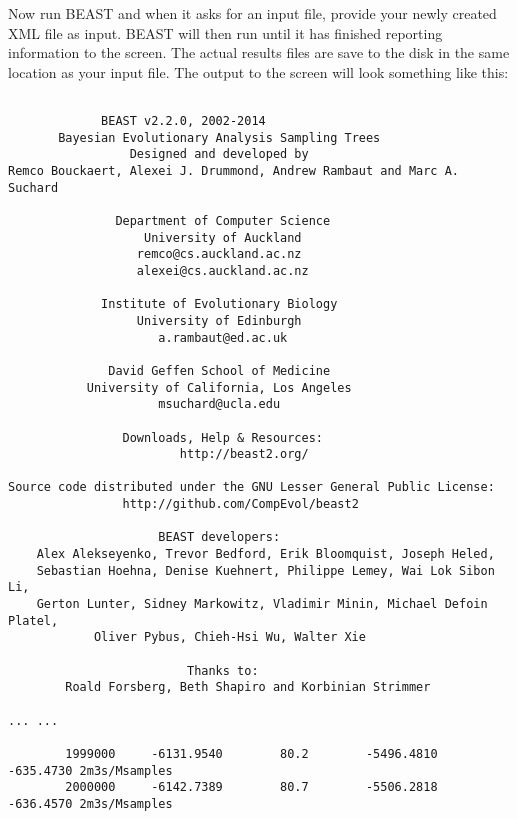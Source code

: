 \documentclass[12pt]{article}
\begin{document}
Now run BEAST and when it asks for an input file, provide your newly
created XML file as input. BEAST will then run until it has finished
reporting information to the screen. The actual results files are
save to the disk in the same location as your input file. The output to the screen will
look something like this: 

{\tiny   
\begin{verbatim}

             BEAST v2.2.0, 2002-2014
       Bayesian Evolutionary Analysis Sampling Trees
                 Designed and developed by
Remco Bouckaert, Alexei J. Drummond, Andrew Rambaut and Marc A. Suchard
                              
               Department of Computer Science
                   University of Auckland
                  remco@cs.auckland.ac.nz
                  alexei@cs.auckland.ac.nz
                              
             Institute of Evolutionary Biology
                  University of Edinburgh
                     a.rambaut@ed.ac.uk
                              
              David Geffen School of Medicine
           University of California, Los Angeles
                     msuchard@ucla.edu
                              
                Downloads, Help & Resources:
                    	http://beast2.org/
                              
Source code distributed under the GNU Lesser General Public License:
             	http://github.com/CompEvol/beast2
                              
                     BEAST developers:
	Alex Alekseyenko, Trevor Bedford, Erik Bloomquist, Joseph Heled, 
	Sebastian Hoehna, Denise Kuehnert, Philippe Lemey, Wai Lok Sibon Li, 
	Gerton Lunter, Sidney Markowitz, Vladimir Minin, Michael Defoin Platel, 
          	Oliver Pybus, Chieh-Hsi Wu, Walter Xie
                              
                         Thanks to:
    	Roald Forsberg, Beth Shapiro and Korbinian Strimmer

... ...

        1999000     -6131.9540        80.2        -5496.4810      -635.4730 2m3s/Msamples
        2000000     -6142.7389        80.7        -5506.2818      -636.4570 2m3s/Msamples


\end{verbatim}}
\end{document}
